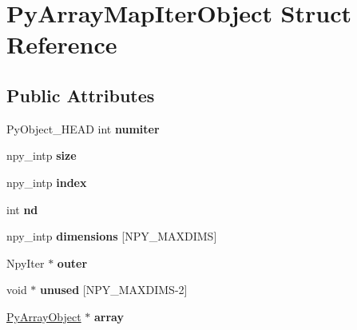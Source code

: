 \hypertarget{structPyArrayMapIterObject}{}\section{Py\+Array\+Map\+Iter\+Object Struct Reference}
\label{structPyArrayMapIterObject}
\subsection*{Public Attributes}
\begin{DoxyCompactItemize}
\item 
Py\+Object\+\_\+\+H\+E\+AD int {\bfseries numiter}\hypertarget{structPyArrayMapIterObject_ac44284d2e5bc0f503fb24fcf5ac0aa89}{}\label{structPyArrayMapIterObject_ac44284d2e5bc0f503fb24fcf5ac0aa89}

\item 
npy\+\_\+intp {\bfseries size}\hypertarget{structPyArrayMapIterObject_af00e85d9e0daf4b4bed60c3014612398}{}\label{structPyArrayMapIterObject_af00e85d9e0daf4b4bed60c3014612398}

\item 
npy\+\_\+intp {\bfseries index}\hypertarget{structPyArrayMapIterObject_a9b34a9ad621aee21d34a6c475fdd99ae}{}\label{structPyArrayMapIterObject_a9b34a9ad621aee21d34a6c475fdd99ae}

\item 
int {\bfseries nd}\hypertarget{structPyArrayMapIterObject_ac99a51d4e8e938dadbdf72cb66fd810b}{}\label{structPyArrayMapIterObject_ac99a51d4e8e938dadbdf72cb66fd810b}

\item 
npy\+\_\+intp {\bfseries dimensions} \mbox{[}N\+P\+Y\+\_\+\+M\+A\+X\+D\+I\+MS\mbox{]}\hypertarget{structPyArrayMapIterObject_a0f8db38ac7c6f88350b773788e44ff19}{}\label{structPyArrayMapIterObject_a0f8db38ac7c6f88350b773788e44ff19}

\item 
Npy\+Iter $\ast$ {\bfseries outer}\hypertarget{structPyArrayMapIterObject_a530339f4ea30ee0f09a630a43c80967a}{}\label{structPyArrayMapIterObject_a530339f4ea30ee0f09a630a43c80967a}

\item 
void $\ast$ {\bfseries unused} \mbox{[}N\+P\+Y\+\_\+\+M\+A\+X\+D\+I\+MS-\/2\mbox{]}\hypertarget{structPyArrayMapIterObject_a0cc749b1be5eb846f120944200826356}{}\label{structPyArrayMapIterObject_a0cc749b1be5eb846f120944200826356}

\item 
\hyperlink{structtagPyArrayObject__fields}{Py\+Array\+Object} $\ast$ {\bfseries array}\hypertarget{structPyArrayMapIterObject_a3179b7bdfa2010433feb84f1193d3601}{}\label{structPyArrayMapIterObject_a3179b7bdfa2010433feb84f1193d3601}


\end{DoxyCompactItemize}
